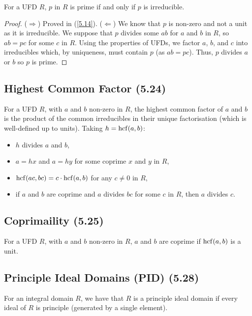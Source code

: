 For a UFD $R$, $p$ in $R$ is prime if and only if $p$ is irreducible.

\begin{proof}
    ($\Longrightarrow$) Proved in (\ref{5.14}).
    \bs
    ($\Longleftarrow$) We know that $p$ is non-zero and not a unit as it is irreducible.
    We suppose that $p$ divides some $ab$ for $a$ and $b$ in $R$, so $ab = pc$ for some
    $c$ in $R$. Using the properties of UFDs, we factor $a$, $b$, and $c$ into
    irreducibles which, by uniqueness, must contain $p$ (as $ab = pc$). Thus,
    $p$ divides $a$ or $b$ so $p$ is prime.
\end{proof}

\subsection{Highest Common Factor (5.24)} \label{5.24}

For a UFD $R$, with $a$ and $b$ non-zero in $R$, the highest common factor of $a$ and $b$
is the product of the common irreducibles in their unique factorisation (which is well-defined
up to units). Taking $h = \operatorname{hcf}(a, b)$: \begin{itemize}
    \item $h$ divides $a$ and $b$,
    \item $a = hx$ and $a = hy$ for some coprime $x$ and $y$ in $R$,
    \item $\operatorname{hcf}(ac, bc) = c \cdot \operatorname{hcf}(a, b)$ for any $c \neq 0$ in $R$,
    \item if $a$ and $b$ are coprime and $a$ divides $bc$ for some $c$ in $R$, then
        $a$ divides $c$.
\end{itemize}

\subsection{Coprimaility (5.25)} \label{5.25}

For a UFD $R$, with $a$ and $b$ non-zero in $R$, $a$ and $b$ are coprime if $\operatorname{hcf}(a, b)$
is a unit.

\subsection{Principle Ideal Domains (PID) (5.28)} \label{5.28}

For an integral domain $R$, we have that $R$ is a principle ideal domain if every ideal
of $R$ is principle (generated by a single element).

